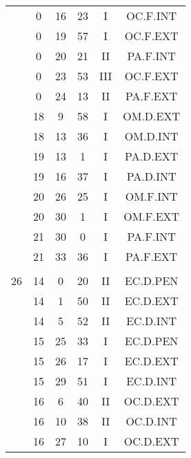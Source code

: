 \documentclass[12pt, a4paper]{article}
\begin{document}
\begin{multicols}{3}
{\begin{tabular}{c c c c c c}
	 	 	 	 & 0 & 16 & 23 & I & OC.F.INT\\%
	 	 	 	 & 0 & 19 & 57 & I & OC.F.EXT\\%
	 	 	 	 & 0 & 20 & 21 & II & PA.F.INT\\%
	 	 	 	 & 0 & 23 & 53 & III & OC.F.EXT\\%
	 	 	 	 & 0 & 24 & 13 & II & PA.F.EXT\\%
	 	 	 	 & 18 & 9 & 58 & I & OM.D.EXT\\%
	 	 	 	 & 18 & 13 & 36 & I & OM.D.INT\\%
	 	 	 	 & 19 & 13 & 1 & I & PA.D.EXT\\%
	 	 	 	 & 19 & 16 & 37 & I & PA.D.INT\\%
	 	 	 	 & 20 & 26 & 25 & I & OM.F.INT\\%
	 	 	 	 & 20 & 30 & 1 & I & OM.F.EXT\\%
	 	 	 	 & 21 & 30 & 0 & I & PA.F.INT\\%
	 	 	 	 & 21 & 33 & 36 & I & PA.F.EXT\\%
	 	 	 	 & & & & & \\%
	 	 	 	26 & 14 & 0 & 20 & II & EC.D.PEN\\%
	 	 	 	 & 14 & 1 & 50 & II & EC.D.EXT\\%
	 	 	 	 & 14 & 5 & 52 & II & EC.D.INT\\%
	 	 	 	 & 15 & 25 & 33 & I & EC.D.PEN\\%
	 	 	 	 & 15 & 26 & 17 & I & EC.D.EXT\\%
	 	 	 	 & 15 & 29 & 51 & I & EC.D.INT\\%
	 	 	 	 & 16 & 6 & 40 & II & OC.D.EXT\\%
	 	 	 	 & 16 & 10 & 38 & II & OC.D.INT\\%
	 	 	 	 & 16 & 27 & 10 & I & OC.D.EXT\\%

\end{tabular}}
\end{multicols}
\end{document}
